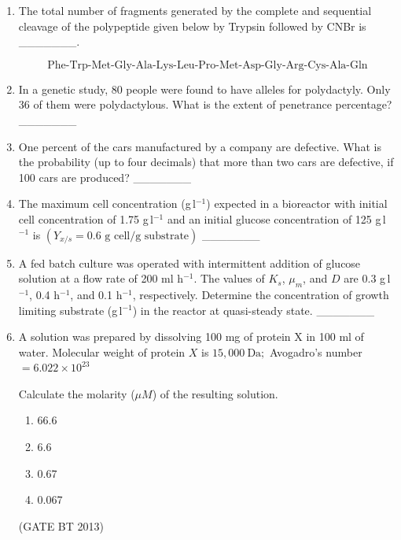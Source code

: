 \documentclass[journal,12pt,onecolumn]{IEEEtran}
\theoremstyle{remark}
\begin{document}
\begin{enumerate}
\item 

The total number of fragments generated by the complete and sequential cleavage of the polypeptide given below by Trypsin followed by CNBr is \_\_\_\_\_\_\_.

\[
\text{Phe-Trp-Met-Gly-Ala-Lys-Leu-Pro-Met-Asp-Gly-Arg-Cys-Ala-Gln}
\]
\item 

In a genetic study, 80 people were found to have alleles for polydactyly. Only 36 of them were polydactylous. What is the extent of penetrance percentage? \_\_\_\_\_\_\_

\item 

One percent of the cars manufactured by a company are defective. What is the probability (up to four decimals) that more than two cars are defective, if 100 cars are produced? \_\_\_\_\_\_\_

\item 

The maximum cell concentration (g\,l\(^{-1}\)) expected in a bioreactor with initial cell concentration of 1.75 g\,l\(^{-1}\) and an initial glucose concentration of 125 g\,l\(^{-1}\) is \(\left(Y_{x/s} = 0.6 \text{ g cell/g substrate}\right)\) \_\_\_\_\_\_\_

\item 

A fed batch culture was operated with intermittent addition of glucose solution at a flow rate of 200 ml h\(^{-1}\). The values of \(K_s\), \(\mu_m\), and \(D\) are 0.3 g\,l\(^{-1}\), 0.4 h\(^{-1}\), and 0.1 h\(^{-1}\), respectively. Determine the concentration of growth limiting substrate (g\,l\(^{-1}\)) in the reactor at quasi-steady state. \_\_\_\_\_\_\_
\item 

A solution was prepared by dissolving 100 mg of protein X in 100 ml of water.  
Molecular weight of protein \(X\) is \(15{,}000\ \mathrm{Da};\) Avogadro's number \(= 6.022 \times 10^{23}\)

Calculate the molarity (\(\mu M\)) of the resulting solution.

\begin{enumerate}[label=(\Alph*)]
    \item 66.6
    \item 6.6
    \item 0.67
    \item 0.067
\end{enumerate} \hfill(GATE BT 2013)


\end{enumerate}
\end{document}
